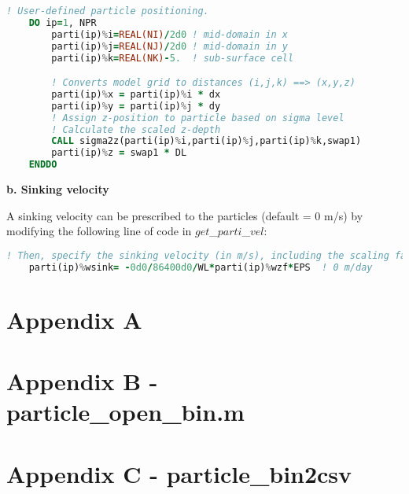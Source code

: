 \documentclass[12pt,letterpaper,titlepage]{article}
\begin{document}
\begin{lstlisting}[language=fortran]
! User-defined particle positioning.    
	DO ip=1, NPR
		parti(ip)%i=REAL(NI)/2d0 ! mid-domain in x
		parti(ip)%j=REAL(NJ)/2d0 ! mid-domain in y
		parti(ip)%k=REAL(NK)-5.  ! sub-surface cell

		! Converts model grid to distances (i,j,k) ==> (x,y,z)
		parti(ip)%x = parti(ip)%i * dx
		parti(ip)%y = parti(ip)%j * dy
		! Assign z-position to particle based on sigma level
		! Calculate the scaled z-depth
		CALL sigma2z(parti(ip)%i,parti(ip)%j,parti(ip)%k,swap1)
		parti(ip)%z = swap1 * DL
	ENDDO
\end{lstlisting}
\textbf{\indent b. Sinking velocity\\}

A sinking velocity can be prescribed to the particles (default = 0 m/s) by modifying the following line of code in $get$\_$parti$\_$vel$:

\begin{lstlisting}[language=fortran]
! Then, specify the sinking velocity (in m/s), including the scaling factors
	parti(ip)%wsink= -0d0/86400d0/WL*parti(ip)%wzf*EPS  ! 0 m/day
\end{lstlisting}


\pagebreak
\appendix
%
\section*{Appendix A}
\label{app: particle_sinking}


\section*{Appendix B - particle\_open\_bin.m}
\label{app: particle_open_bin}

\pagebreak

\section*{Appendix C - particle\_bin2csv}
\label{app: particle_bin2csv}


\pagebreak
\glsaddall				%
\renewcommand*{\arraystretch}{0.3}%
\printglossaries
\end{document}
